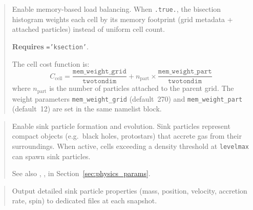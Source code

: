 \label{param:memory_balance}

\begin{quote}
Enable memory-based load balancing.  When \texttt{.true.}, the
bisection histogram weights each cell by its memory footprint (grid
metadata + attached particles) instead of uniform cell count.

\textbf{Requires} \texttt{='ksection'}.

The cell cost function is:
\[
  C_{\text{cell}} = \frac{\texttt{mem\_weight\_grid}}{\texttt{twotondim}}
                + n_{\text{part}} \times
                  \frac{\texttt{mem\_weight\_part}}{\texttt{twotondim}}
\]
where $n_{\text{part}}$ is the number of particles attached to the parent
grid.  The weight parameters \texttt{mem\_weight\_grid} (default~270) and
\texttt{mem\_weight\_part} (default~12) are set in the same namelist block.

\end{quote}

\label{param:sink}

\begin{quote}
Enable sink particle formation and evolution.  Sink particles represent
compact objects (e.g.\ black holes, protostars) that accrete gas from
their surroundings.  When active, cells exceeding a density threshold
at \texttt{levelmax} can spawn sink particles.

See also , ,  in
Section~\ref{sec:physics_params}.
\end{quote}

\label{param:sinkprops}

\begin{quote}
Output detailed sink particle properties (mass, position, velocity,
accretion rate, spin) to dedicated files at each snapshot.
\end{quote}

\label{param:lightcone}

